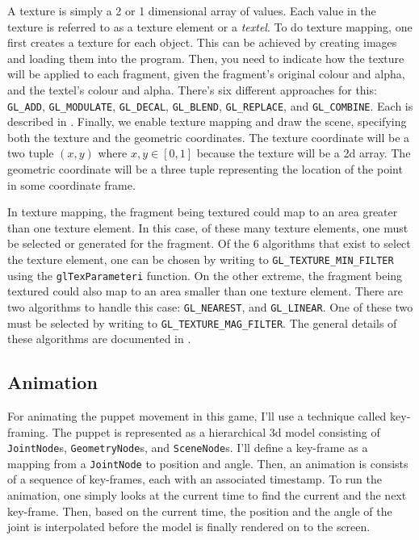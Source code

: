 \documentclass[11pt]{article}
\begin{document}
A texture is simply a 2 or 1 dimensional array of values. Each value in the texture is referred to as a texture element or a \textit{textel}. To do texture mapping, one first creates a texture for each object. This can be achieved by creating images and loading them into the program. Then, you need to indicate how the texture will be applied to each fragment, given the fragment's original colour and alpha, and the textel's colour and alpha. There's six different approaches for this: \verb|GL_ADD|, \verb|GL_MODULATE|, \verb|GL_DECAL|, \verb|GL_BLEND|, \verb|GL_REPLACE|, and \verb|GL_COMBINE|. Each is described in \cite{texture-map-fn}. Finally, we enable texture mapping and draw the scene, specifying both the texture and the geometric coordinates. The texture coordinate will be a two tuple $(x, y)$ where $x,y \in [0, 1]$ because the texture will be a 2d array. The geometric coordinate will be a three tuple representing the location of the point in some coordinate frame.

In texture mapping, the fragment being textured could map to an area greater than one texture element. In this case, of these many texture elements, one must be selected or generated for the fragment. Of the 6 algorithms that exist to select the texture element, one can be chosen by writing to \verb|GL_TEXTURE_MIN_FILTER| using the \verb|glTexParameteri| function. On the other extreme, the fragment being textured could also map to an area smaller than one texture element. There are two algorithms to handle this case: \verb|GL_NEAREST|, and \verb|GL_LINEAR|. One of these two must be selected by writing to \verb|GL_TEXTURE_MAG_FILTER|. The general details of these algorithms are documented in \cite{gl-tex-parameter}.

\subsection*{Animation}
For animating the puppet movement in this game, I'll use a technique called key-framing. The puppet is represented as a hierarchical 3d model consisting of \verb|JointNode|s, \verb|GeometryNode|s, and \verb|SceneNode|s. I'll define a key-frame as a mapping from a \verb|JointNode| to position and angle. Then, an animation is consists of a sequence of key-frames, each with an associated timestamp. To run the animation, one simply looks at the current time to find the current and the next key-frame. Then, based on the current time, the position and the angle of the joint is interpolated before the model is finally rendered on to the screen.
\end{document}
